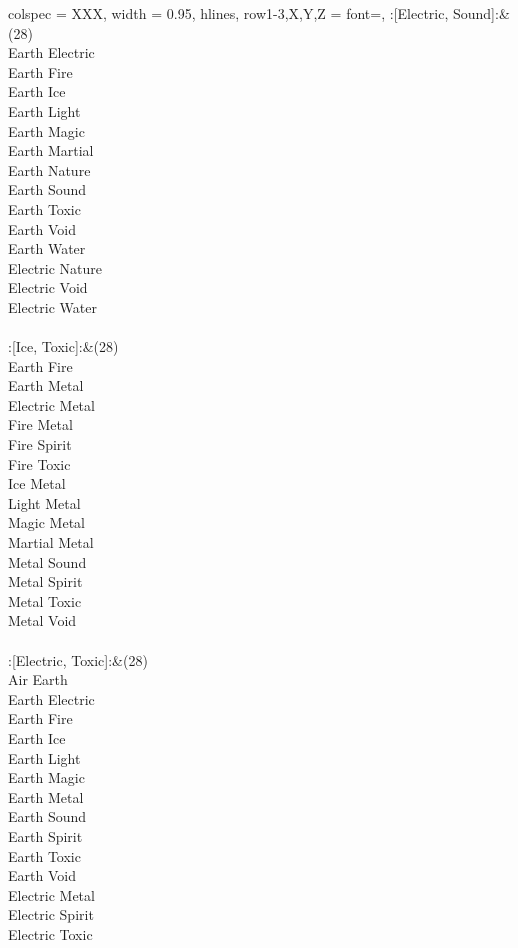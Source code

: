 \begin{longtblr}[
	caption = {2v2 Attacking Ineffective},
	label = {2v2-Attacking-Ineffective},
]{
	colspec = {XXX}, width = 0.95\linewidth,
	hlines,
	row{1-3,X,Y,Z} = {font=\bfseries},
}
	:[Electric, Sound]:&{(28)\\
	Earth Electric \\
	Earth Fire \\
	Earth Ice \\
	Earth Light \\
	Earth Magic \\
	Earth Martial \\
	Earth Nature \\
	Earth Sound \\
	Earth Toxic \\
	Earth Void \\
	Earth Water \\
	Electric Nature \\
	Electric Void \\
	Electric Water \\
	}\\

	:[Ice, Toxic]:&{(28)\\
	Earth Fire \\
	Earth Metal \\
	Electric Metal \\
	Fire Metal \\
	Fire Spirit \\
	Fire Toxic \\
	Ice Metal \\
	Light Metal \\
	Magic Metal \\
	Martial Metal \\
	Metal Sound \\
	Metal Spirit \\
	Metal Toxic \\
	Metal Void \\
	}\\

	:[Electric, Toxic]:&{(28)\\
	Air Earth \\
	Earth Electric \\
	Earth Fire \\
	Earth Ice \\
	Earth Light \\
	Earth Magic \\
	Earth Metal \\
	Earth Sound \\
	Earth Spirit \\
	Earth Toxic \\
	Earth Void \\
	Electric Metal \\
	Electric Spirit \\
	Electric Toxic \\
	}\\


\end{longtblr}
